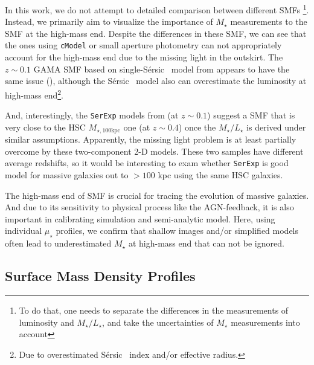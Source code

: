 \documentclass[a4paper,fleqn,usenatbib]{mnras}
\def\ser{{S\'{e}rsic\ }}
\def\mstar{{$M_{\star}$}}
\def\mtot{{$M_{\star,100\mathrm{kpc}}$}}
\def\m2l{{$M_{\star}/L_{\star}$}}
\def\mden{{$\mu_{\star}$}}
\begin{document}
    In this work, we do not attempt to detailed comparison between different SMFs
    \citep[e.g.,][]{Bernardi2013, Bernardi2017} \footnote{To do that, one needs to 
    separate the differences in the measurements of luminosity and \m2l{}, and 
    take the uncertainties of \mstar{} measurements into account}.
    Instead, we primarily aim to visualize the importance of \mstar{} measurements 
    to the SMF at the high-mass end.
    Despite the differences in these SMF, we can see that the ones using 
    \texttt{cModel} or small aperture photometry can not appropriately account for 
    the high-mass end due to the missing light in the outskirt. 
    The $z{\sim}0.1$ GAMA SMF based on single-\ser{} model from \citet{Kelvin2012} 
    appears to have the same issue (\citealt{Wright2017}), although the \ser{} model
    also can overestimate the luminosity at high-mass end\footnote{Due to 
    overestimated \ser{} index and/or effective radius.}. 
    
    And, interestingly, the \texttt{SerExp} models from \citet{Bernardi2017} (at 
    $z{\sim}0.1$) suggest a SMF that is very close to the HSC \mtot{} one 
    (at $z{\sim}0.4$) once the \m2l{} is derived under similar assumptions.
    Apparently, the missing light problem is at least partially overcome by these 
    two-component 2-D models. 
    These two samples have different average redshifts, so it would be interesting
    to exam whether \texttt{SerExp} is good model for massive galaxies out to 
    $>100$ kpc using the same HSC galaxies.  
            
    The high-mass end of SMF is crucial for tracing the evolution of massive 
    galaxies.  
    And due to its sensitivity to physical process like the AGN-feedback, it is also 
    important in calibrating simulation and semi-analytic model.
    Here, using individual \mden{} profiles, we confirm that shallow images and/or
    simplified models often lead to underestimated \mstar{} at high-mass end that 
    can not be ignored.

\subsection{Surface Mass Density Profiles}
    \label{ssec:sbp_compare}
\end{document}
